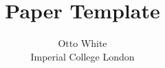 \documentclass[letterpaper,twocolumn,10pt]{article}
\begin{document}
\date{}

\title{\Large \bf Paper Template}
\author{{\rm Otto White}\\Imperial College London}

\maketitle












\end{document}
